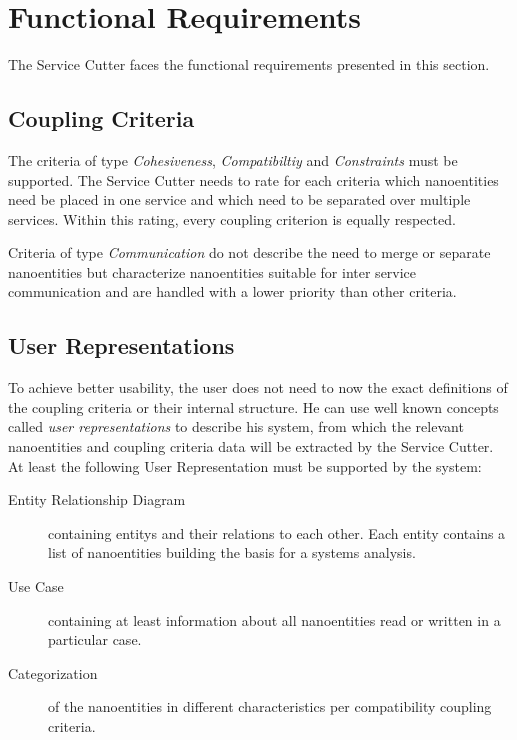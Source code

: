 \section{Functional Requirements}
\label{sec:functionalRequirements}

The Service Cutter faces the functional requirements presented in this
section.


\subsection{Coupling Criteria}

The criteria of type \textit{Cohesiveness}, \textit{Compatibiltiy} and \textit{Constraints} must be supported. The Service Cutter needs to rate for each criteria which nanoentities need be placed in one service and which need to be separated over multiple services. Within this rating, every coupling criterion is equally respected.

Criteria of type \textit{Communication} do not describe the need to merge or separate nanoentities but characterize nanoentities suitable for inter service communication and are handled with a lower priority than other criteria. 

\subsection{User Representations}

To achieve better usability, the user does not need to now the exact definitions of the coupling criteria or their internal structure. He can use well known concepts called \textit{user representations} to describe his system, from which the relevant nanoentities and coupling criteria data will be extracted by the Service Cutter. At least the following User Representation must be supported by the system:

\begin{description}
	\item[Entity Relationship Diagram] containing \glspl{entity} and their relations to each other. Each entity contains a list of nanoentities building the basis for a systems analysis.
	\item[Use Case] containing at least information about all nanoentities read or written in a particular case. 
	\item[Categorization] of the nanoentities in different characteristics per compatibility coupling criteria. 
\end{description}

